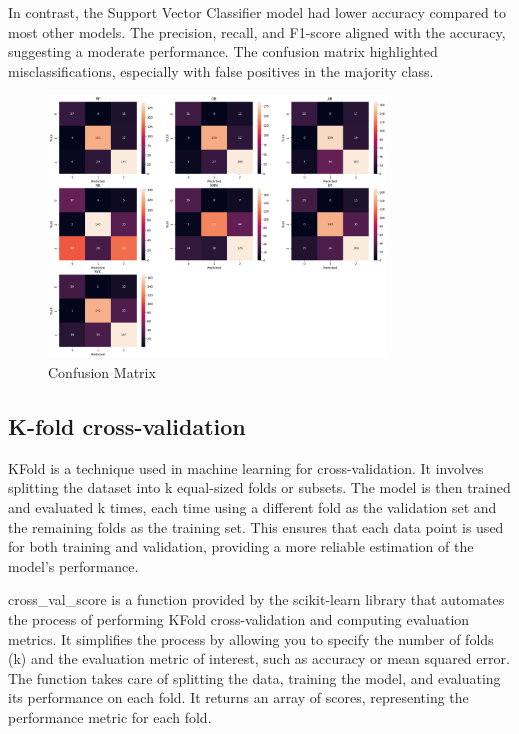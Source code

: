 In contrast, the Support Vector Classifier model had lower accuracy compared to most other models. The precision, recall, and F1-score aligned with the accuracy, suggesting a moderate performance. The confusion matrix highlighted misclassifications, especially with false positives in the majority class.

\begin{figure}[h!]
    \centering
    \includegraphics[width=0.8\textwidth]{imgs/confusion matrix.png}
    \caption{Confusion Matrix}
    \label{fig:ConfusionMatrix}
\end{figure}

\subsection{K-fold cross-validation}
KFold is a technique used in machine learning for cross-validation. It involves splitting the dataset into k equal-sized folds or subsets. The model is then trained and evaluated k times, each time using a different fold as the validation set and the remaining folds as the training set. This ensures that each data point is used for both training and validation, providing a more reliable estimation of the model's performance.

cross\_val\_score is a function provided by the scikit-learn library that automates the process of performing KFold cross-validation and computing evaluation metrics. It simplifies the process by allowing you to specify the number of folds (k) and the evaluation metric of interest, such as accuracy or mean squared error. The function takes care of splitting the data, training the model, and evaluating its performance on each fold. It returns an array of scores, representing the performance metric for each fold.

